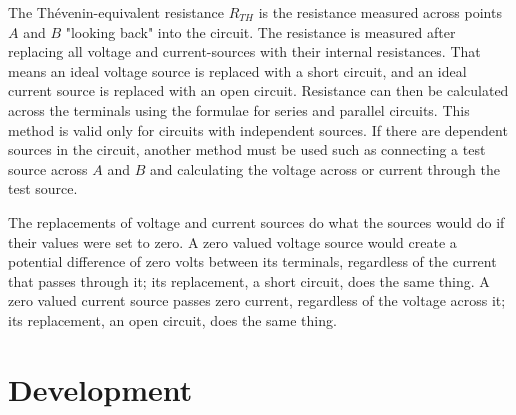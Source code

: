 \documentclass[letterpaper]{article}
\begin{document}
        The Thévenin-equivalent resistance $R_{TH}$ is the resistance measured across points
        $A$ and $B$ "looking back" into the circuit. The resistance is measured after replacing
        all voltage and current-sources with their internal resistances. That means an ideal
        voltage source is replaced with a short circuit, and an ideal current source is replaced
        with an open circuit. Resistance can then be calculated across the terminals using the
        formulae for series and parallel circuits. This method is valid only for circuits with
        independent sources. If there are dependent sources in the circuit, another method must
        be used such as connecting a test source across $A$ and $B$ and calculating the voltage across or current through the test source.

        The replacements of voltage and current sources do what the sources would do if their values were set to zero. A zero valued voltage source would create a potential difference of zero volts between its terminals, regardless of the current that passes through it; its replacement, a short circuit, does the same thing. A zero valued current source passes zero current, regardless of the voltage across it; its replacement, an open circuit, does the same thing.
\newpage
\section{Development}
\end{document}
